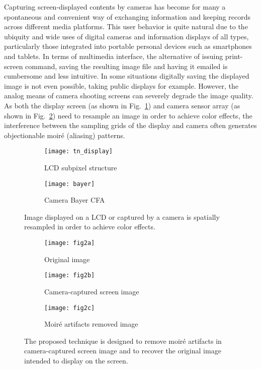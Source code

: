 \documentclass[10pt,twocolumn,letterpaper]{article}
\begin{document}
Capturing screen-displayed contents by cameras has become for many a
spontaneous and convenient way of exchanging information and keeping
records across different media platforms.  This user behavior is quite
natural due to the ubiquity and wide uses of digital cameras and
information displays of all types, particularly those integrated into
portable personal devices such as smartphones and tablets.  In terms
of multimedia interface, the alternative of issuing print-screen
command, saving the resulting image file and having it emailed is
cumbersome and less intuitive.  In some situations digitally saving
the displayed image is not even possible, taking public displays for
example.  However, the analog means of camera shooting screens can
severely degrade the image quality.  As both the display screen (as
shown in Fig.~\ref{fig:synth_lcd}) and camera sensor array (as shown
in Fig.~\ref{fig:synth_cam}) need to resample an image in order to
achieve color effects, the interference between the sampling grids of
the display and camera often generates objectionable moir\'e
(aliasing) patterns.


\begin{figure}
  \centering
  \begin{subfigure}{0.45\linewidth}
    \centering
    \texttt{[image: tn\_display]}
    \caption{LCD subpixel structure}
    \label{fig:synth_lcd}
  \end{subfigure}
  \begin{subfigure}{0.45\linewidth}
    \centering
    \texttt{[image: bayer]}
    \caption{Camera Bayer CFA}
    \label{fig:synth_cam}
  \end{subfigure}
  \caption{Image displayed on a LCD or captured by a camera is
    spatially resampled in order to achieve color effects.}
  \label{fig:synth}
\end{figure}

\begin{figure}
  \centering
  \begin{subfigure}[t]{0.32\linewidth}
    \centering
    \texttt{[image: fig2a]}
    \caption{Original image}
  \end{subfigure}
  \begin{subfigure}[t]{0.32\linewidth}
    \centering
    \texttt{[image: fig2b]}
    \caption{Camera-captured screen image}
  \end{subfigure}
  \begin{subfigure}[t]{0.32\linewidth}
    \centering
    \texttt{[image: fig2c]}
    \caption{Moir\'e artifacts removed image}
  \end{subfigure}
  \caption{The proposed technique is designed to remove moir\'e
    artifacts in camera-captured screen image and to recover the
    original image intended to display on the screen.}
  \label{fig:purpose}
\end{figure}
\end{document}
